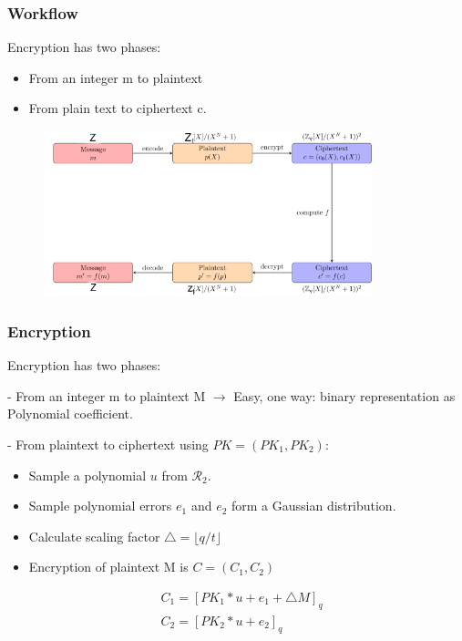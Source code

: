\documentclass[10pt]{beamer}
\begin{document}
\begin{frame}[noframenumbering]
\frametitle{Workflow}

    Encryption has two phases:
\begin{itemize}
    \item From an integer m to plaintext
    \item From plain text to ciphertext c.
\end{itemize}


\begin{figure}
    \includegraphics[width=0.85\textwidth]{bfv-diagram.png}
\end{figure}


\end{frame}


\begin{frame}[noframenumbering]

    \frametitle{Encryption}

    Encryption has two phases:

    - From an integer m to plaintext M $\rightarrow$ Easy, one way: binary representation as Polynomial coefficient.

    - From plaintext to ciphertext using $PK = (PK_1, PK_2)$:

    \begin{itemize}
        \item Sample a polynomial $u$ from $\mathcal{R}_2$.
        \item Sample polynomial errors $e_1$ and $e_2$ form a Gaussian distribution.
        \item Calculate scaling factor $\triangle = \lfloor q/t\rfloor $
        \item Encryption of plaintext M is $C=(C_1, C_2)$
    \end{itemize}
    \begin{align}
        &C_1 = [PK_1 * u + e_1 + \triangle M ]_q\nonumber \\
        &C_2 = [PK_2 * u + e_2]_q\nonumber
    \end{align}


\end{frame}
\end{document}
